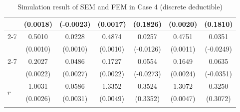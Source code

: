 \documentclass[11pt]{article}
\begin{document}
\begin{table}[!ht]
{{\begin{minipage}{0.65\textwidth}
\begin{tabular}{lcccccc}
         & (0.0018) & (-0.0023) & (0.0017) & (0.1826) & (0.0020) & (0.1810) \\
        \cmidrule{2-7}
         & 0.5010 & 0.0228 & 0.4874 & 0.0257 & 0.4751 & 0.0351 \\
         & (0.0010) & (0.0010) & (0.0010) & (-0.0126) & (0.0011) & (-0.0249) \\
        \cmidrule{2-7}
         & 0.2027 & 0.0486 & 0.1727 & 0.0554 & 0.1649 & 0.0635 \\
         & (0.0022) & (0.0027) & (0.0022) & (-0.0273) & (0.0024) & (-0.0351) \\
        \midrule
        \multirow{2}{*}{$r$} & 1.0031 & 0.0586 & 1.3352 & 0.3524 & 1.3072 & 0.3250 \\
         & (0.0026) & (0.0031) & (0.0049) & (0.3352) & (0.0047) & (0.3072) \\
        \hhline{=======}
        \end{tabular}
    \end{minipage}
}
}
\caption{Simulation result of SEM and FEM in Case 4 (discrete deductible)}\label{tab:AppSimExoCase4}
\end{table}
\end{document}
